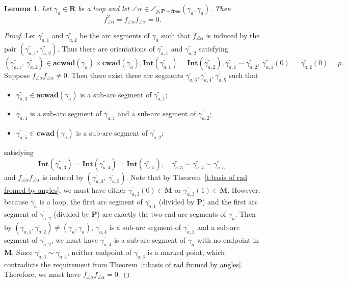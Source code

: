 \documentclass[a4paper,10pt]{amsart}
\theoremstyle{plain}          %
\newtheorem{lemma}[theorem]{Lemma}
\theoremstyle{definition}
\def\MM{\mathbf{M}}
\def\PP{\mathbf{P}}
\def\MM{\mathbf{M}}
\newcommand{\Intv}{\underline{\mathbf{Int}}}
\newcommand{\appfree}{\angle^-_{p,\mathbf{P-free}}}
\newcommand{\aad}{\mathbf{acwad}}
\newcommand{\cad}{\mathbf{cwad}}
\begin{document}
\begin{lemma}\label{l:relation for gamma_a is a loop}
    Let $\gamma_a\in\mathbf{R}$ be a loop and let $\angle\alpha\in\appfree(\gamma_a,\gamma_a)$.
    Then $$f^2_{\angle\alpha}=f_{\angle\alpha} f_{\angle\alpha}=0.$$
\end{lemma}
\begin{proof}
     Let $\widetilde{\gamma_{a,1}}$ and $ \widetilde{\gamma_{a,2}}$ be the arc segments of $\gamma_a$ such that $f_{\angle\alpha}$ is induced by the pair $(\widetilde{\gamma_{a,1}}, \widetilde{\gamma_{a,2}})$. Thus there are orientations of $\widetilde{\gamma_{a,1}}$ and $\widetilde{\gamma_{a,2}}$ satisfying
 \[(\widetilde{\gamma_{a,1}},~\widetilde{\gamma_{a,2}})\in\aad(\gamma_a)\times\cad(\gamma_a), \Intv(\widetilde{\gamma_{a,1}})=\Intv(\widetilde{\gamma_{a,2}}), \widetilde{\gamma_{a,1}}\sim\widetilde{\gamma_{a,2}},~\widetilde{\gamma_{a,1}}(0)=~\widetilde{\gamma_{a,2}}(0)=p.\]
 Suppose $f_{\angle\alpha} f_{\angle\alpha}\neq 0$. Then there exist three arc segments 
 $\widetilde{\gamma_{a,3}},\widetilde{\gamma_{a,4}}, \widetilde{\gamma_{a,5}}$ such that 
\begin{itemize}
    \item  $\widetilde{\gamma_{a,3}}\in\aad(\gamma_{a})$ is a sub-arc segment of $\widetilde{\gamma_{a,1}}$;
    \item  $\widetilde{\gamma_{a,4}}$ is a sub-arc segment of $\widetilde{\gamma_{a,1}}$ and a sub-arc segment of $\widetilde{\gamma_{a,2}}$;
    \item $\widetilde{\gamma_{a,5}}\in\cad(\gamma_{a})$ is a sub-arc segment of $\widetilde{\gamma_{a,2}}$;
\end{itemize}
 satisfying $$ \Intv(\widetilde{\gamma_{a,3}})=\Intv(\widetilde{\gamma_{a,4}})=\Intv(\widetilde{\gamma_{a,5}}), \quad \widetilde{\gamma_{a,3}}\sim\widetilde{\gamma_{a,4}}\sim\widetilde{\gamma_{a,5}}.$$
and $f_{\angle\alpha} f_{\angle\alpha}$ is induced by $(\widetilde{\gamma_{a,3}},~\widetilde{\gamma_{a,5}}).$ Note that by Theorem~\ref{t:basis of rad fromed by angles}, we must have either $\widetilde{\gamma_{a,3}}(0)\in\MM$ or   $\widetilde{\gamma_{a,3}}(1)\in\MM$.
However,
 because $\gamma_a$ is a loop, the first arc segment of $\widetilde{\gamma_{a,1}}$ (divided by $\PP$) and the first arc segment of $\widetilde{\gamma_{a,2}}$ (divided by $\PP$) are exactly the two end arc segments of $\gamma_a$. Then by 
 $(\widetilde{\gamma_{a,1}}, \widetilde{\gamma_{a,2}})\neq (\gamma_a,\gamma_a)$, $\widetilde{\gamma_{a,4}}$ is a sub-arc segment of $\widetilde{\gamma_{a,1}}$ and a sub-arc segment of $\widetilde{\gamma_{a,2}}$, we must have  $ \widetilde{\gamma_{a,4}}$ is a sub-arc segment of $\gamma_a$ with no endpoint in $\MM$. Since $\widetilde{\gamma_{a,3}} \sim \widetilde{\gamma_{a,4}}$, neither endpoint of $\widetilde{\gamma_{a,3}}$ is a marked point, which contradicts the requirement from Theorem~\ref{t:basis of rad fromed by angles}.  Therefore, we must have  $f_{\angle\alpha} f_{\angle\alpha}=0$. 
\end{proof}
\end{document}
